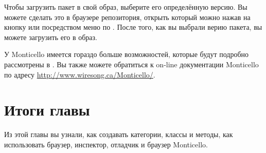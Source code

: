 \documentclass[a4paper,10pt,twoside]{book}
\begin{document}
{%

Чтобы загрузить пакет в свой образ, выберите его определённую версию. Вы можете сделать это в браузере репозитория, открыть который можно нажав на кнопку  или посредством меню по \actclick. После того, как вы выбрали верию пакета, вы можете загрузить его в образ.


У Monticello имеется гораздо больше возможностей, которые будут подробно рассмотрены в .
Вы также можете обратиться к on-line документации Monticello по адресу \url{http://www.wiresong.ca/Monticello/}.

\section{Итоги главы}
Из этой главы вы узнали, как создавать категории, классы и методы, как использовать браузер, инспектор, отладчик и браузер Monticello.

}
\end{document}

